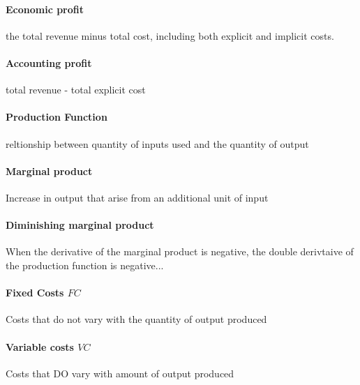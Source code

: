 \documentclass[a4paper,titlepage] {scrartcl}
\begin{document}
\paragraph{Economic profit} %
\label{par:economic_profit} the total revenue minus total cost, including both explicit and implicit costs.

\paragraph{Accounting profit} %
\label{par:accounting_profit}
total revenue - total explicit cost


\paragraph{Production Function} %
\label{par:production_function}
reltionship between quantity of inputs used and the quantity of output 

\paragraph{Marginal product} %
\label{par:marginal_product}
Increase in output that arise from an additional unit of input


\paragraph{Diminishing marginal product} %
\label{par:diminishing_marginal_product}
When the derivative of the marginal product is negative, the double derivtaive of the production function is negative...


\paragraph{Fixed Costs $FC$} %
\label{par:fixed_costs}
Costs that do not vary with the quantity of output produced

\paragraph{Variable costs $VC$} %
\label{par:variable_costs}
Costs that DO vary with amount of output produced
\end{document}

